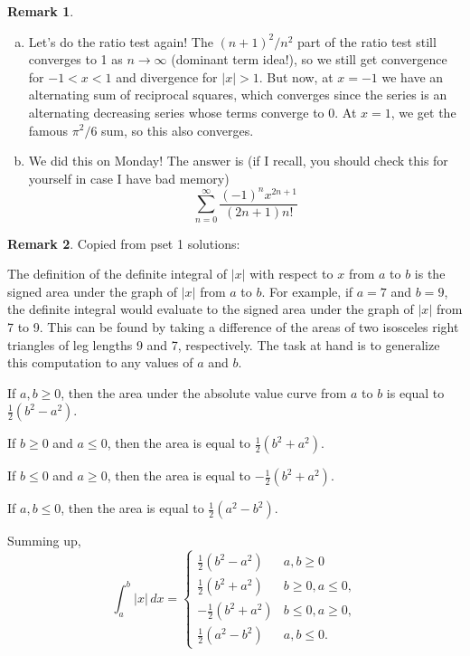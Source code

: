 \documentclass[11pt,oneside]{amsart}
\theoremstyle{definition}
\newtheorem{remark}{Remark}
\begin{document}
\begin{remark}
\begin{enumerate}[(a)]
    \item Let's do the ratio test again! The $(n+1)^2/n^2$ part of the ratio test still converges to 1 as $n\to\infty$ (dominant term idea!), so we still get convergence for $-1<x<1$ and divergence for $|x|>1$. But now, at $x=-1$ we have an alternating sum of reciprocal squares, which converges since the series is an alternating decreasing series whose terms converge to 0. At $x=1$, we get the famous $\pi^2/6$ sum, so this also converges.

    \item We did this on Monday! The answer is (if I recall, you should check this for yourself in case I have bad memory)
          \[\sum_{n=0}^\infty \frac{(-1)^n x^{2n+1}}{(2n+1)n!}\]
  \end{enumerate}
\end{remark}

\begin{remark}
  Copied from pset 1 solutions:

  The definition of the definite integral of $|x|$ with respect to $x$ from $a$ to $b$ is the signed area under the graph of $|x|$ from $a$ to $b$. For example, if $a=7$ and $b=9$, the definite integral would evaluate to the signed area under the graph of $|x|$ from 7 to 9. This can be found by taking a difference of the areas of two isosceles right triangles of leg lengths 9 and 7, respectively. The task at hand is to generalize this computation to any values of $a$ and $b$.

  If $a,b\geq 0$, then the area under the absolute value curve from $a$ to $b$ is equal to $\frac 12(b^2-a^2)$.

  If $b\geq 0$ and $a\leq 0$, then the area is equal to $\frac12(b^2+a^2)$.

  If $b\leq 0$ and $a\geq 0$, then the area is equal to $-\frac12(b^2+a^2)$.

  If $a,b\leq 0$, then the area is equal to $\frac 12(a^2-b^2)$.

  Summing up,
  \[\int_a^b|x|\,dx = \begin{cases}\frac 12(b^2-a^2) & a,b\geq 0        \\
             \frac 12(b^2+a^2) & b\geq 0,a\leq 0, \\
             -\frac12(b^2+a^2) & b\leq 0,a\geq 0, \\
             \frac 12(a^2-b^2) & a,b\leq 0.
    \end{cases}\]
\end{remark}
\end{document}
